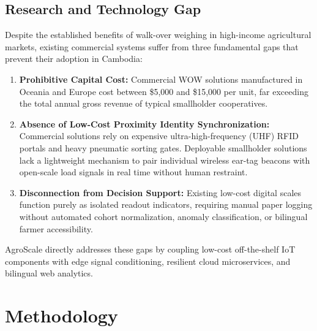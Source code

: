 \documentclass[11pt,a4paper]{report}
\begin{document}
\section{Research and Technology Gap}
Despite the established benefits of walk-over weighing in high-income agricultural markets, existing commercial systems suffer from three fundamental gaps that prevent their adoption in Cambodia:
\begin{enumerate}
    \item \textbf{Prohibitive Capital Cost:} Commercial WOW solutions manufactured in Oceania and Europe cost between \$5,000 and \$15,000 per unit, far exceeding the total annual gross revenue of typical smallholder cooperatives.
    \item \textbf{Absence of Low-Cost Proximity Identity Synchronization:} Commercial solutions rely on expensive ultra-high-frequency (UHF) RFID portals and heavy pneumatic sorting gates. Deployable smallholder solutions lack a lightweight mechanism to pair individual wireless ear-tag beacons with open-scale load signals in real time without human restraint.
    \item \textbf{Disconnection from Decision Support:} Existing low-cost digital scales function purely as isolated readout indicators, requiring manual paper logging without automated cohort normalization, anomaly classification, or bilingual farmer accessibility.
\end{enumerate}
AgroScale directly addresses these gaps by coupling low-cost off-the-shelf IoT components with edge signal conditioning, resilient cloud microservices, and bilingual web analytics.

\clearpage

\chapter{Methodology}
\end{document}
